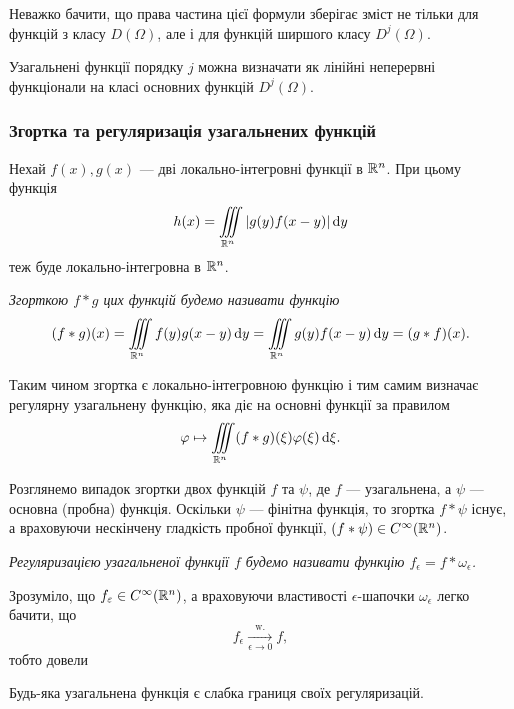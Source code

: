 Неважко бачити, що права частина цієї формули зберігає зміст не тільки для функцій з класу $D(\Omega)$, але і для функцій ширшого класу $D^j(\Omega)$.

\begin{remark}
	Узагальнені функції порядку $j$ можна визначати як лінійні неперервні функціонали на класі основних функцій $D^j(\Omega)$.
\end{remark}



\subsubsection{Згортка та регуляризація узагальнених функцій}

Нехай $f(x), g(x)$ --- дві локально-інтегровні функції в $\mathbb{R}^n$. При цьому функція 
\begin{equation}
	h(x) = \displaystyle\iiint\limits_{\mathbb{R}^n} | g(y) f(x - y) | \mathop{}\!\mathrm{d} y	
\end{equation}
теж буде локально-інтегровна в $\mathbb{R}^n$. 

\begin{definition}[згортки]
	\it{Згорткою} $f * g$ цих функцій будемо називати функцію
	\begin{equation}
		(f * g) (x) = \displaystyle\iiint\limits_{\mathbb{R}^n} f(y) g(x - y) \mathop{}\!\mathrm{d} y =  \displaystyle\iiint\limits_{\mathbb{R}^n} g(y) f(x - y) \mathop{}\!\mathrm{d} y = (g * f)(x).		
	\end{equation}
\end{definition}

Таким чином згортка є локально-інтегровною функцію і тим самим визначає регулярну узагальнену функцію, яка діє на основні функції за правилом
\begin{equation}
	\varphi \mapsto \displaystyle\iiint\limits_{\mathbb{R}^n} (f * g) (\xi) \varphi(\xi) \mathop{}\!\mathrm{d} \xi.	
\end{equation}

Розглянемо випадок згортки двох функцій $f$ та $\psi$, де $f$ --- узагальнена, а $\psi$ --- основна (пробна) функція. Оскільки $\psi$ --- фінітна функція, то згортка $f * \psi$ існує, а враховуючи нескінчену гладкість пробної функції, $(f * \psi) \in C^\infty(\mathbb{R}^n)$.

\begin{definition}
	\it{Регуляризацією} узагальненої функції $f$ будемо називати функцію $f_\epsilon = f * \omega_\epsilon$.
\end{definition}

Зрозуміло, що $f_\varepsilon \in C^\infty (\mathbb{R}^n)$, а враховуючи властивості $\epsilon$-шапочки $\omega_\epsilon$ легко бачити, що 
\begin{equation}
	f_\epsilon \xrightarrow[\epsilon \to 0]{\text{w.}} f,
\end{equation}
тобто довели
\begin{proposition}
	Будь-яка узагальнена функція є слабка границя своїх регуляризацій.
\end{proposition}

